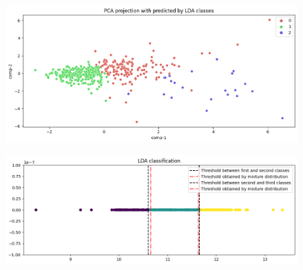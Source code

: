 \documentclass[12pt]{report}
\begin{document}
  \begin{figure}[H]
    \centering
    \includegraphics[scale=0.5]{./imgs/lda_clusters.png}
  \end{figure}
  \begin{figure}[H]
    \centering
    \includegraphics[scale=0.5]{./imgs/lda_income.png}
  \end{figure}
\end{document}
